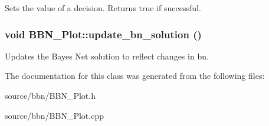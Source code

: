 \label{classBBN__Plot_ab3f21c1b59ad41eb450f16170e13934c}
Sets the value of a decision. Returns true if successful. \hypertarget{classBBN__Plot_a452d2d4a9b15217481ef83b781903627}{
\subsubsection[{update\_\-bn\_\-solution}]{\setlength{\rightskip}{0pt plus 5cm}void BBN\_\-Plot::update\_\-bn\_\-solution ()}}
\label{classBBN__Plot_a452d2d4a9b15217481ef83b781903627}
Updates the Bayes Net solution to reflect changes in bn. 

The documentation for this class was generated from the following files:\begin{DoxyCompactItemize}
\item 
source/bbn/BBN\_\-Plot.h\item 
source/bbn/BBN\_\-Plot.cpp\end{DoxyCompactItemize}
